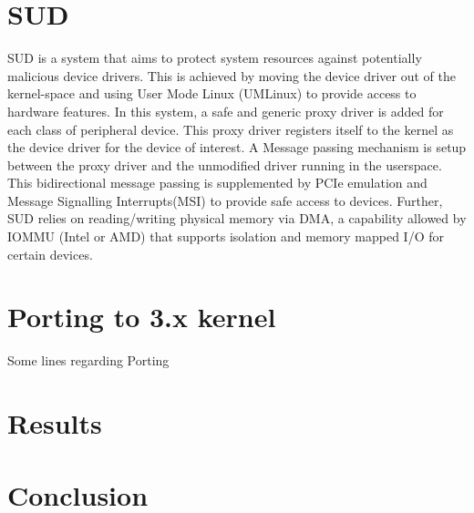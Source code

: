\documentclass[12pt,titlepage,a4paper]{article}
\begin{document}
\section{SUD}
SUD is a system that aims to protect system resources against potentially malicious device drivers. This is achieved by moving the device driver out of the kernel-space and using User Mode Linux (UMLinux) to provide access to hardware features. In this system, a safe and generic proxy driver is added for each class of peripheral device. This proxy driver registers itself to the kernel as the device driver for the device of interest. A Message passing mechanism is setup between the proxy driver and the unmodified driver running in the userspace. This bidirectional message passing is supplemented by PCIe emulation and Message Signalling Interrupts(MSI) to provide safe access to devices. Further, SUD relies on reading/writing physical memory via DMA, a capability allowed by IOMMU (Intel or AMD) that supports isolation and memory mapped I/O for certain devices.
\section{Porting to 3.x kernel}
Some lines regarding Porting 
\section{Results}

\section{Conclusion}
\end{document}
